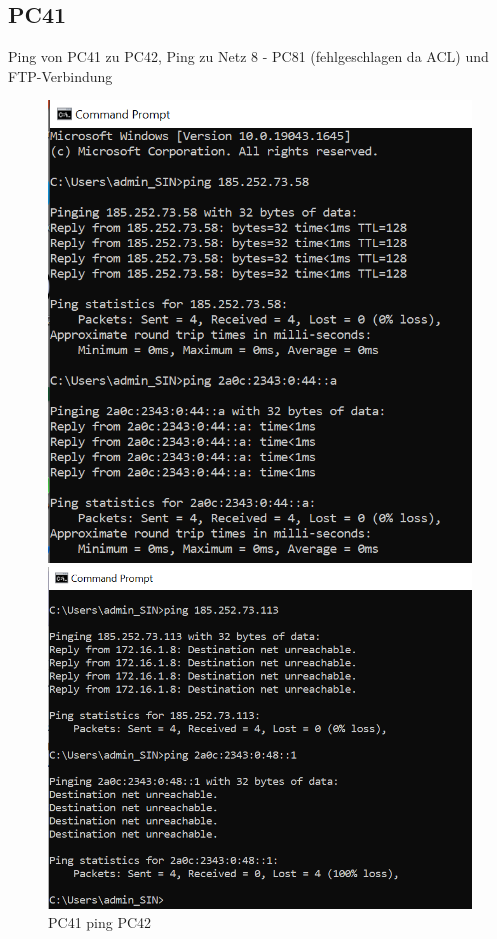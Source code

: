 \documentclass{article}
\begin{document}
\subsection{PC41}
Ping von PC41 zu PC42, Ping zu Netz 8 - PC81 (fehlgeschlagen da ACL) und FTP-Verbindung\\
\begin{figure}[!htp]
  \centering
  \begin{minipage}[b]{0.25\textwidth}
    \includegraphics[width=\textwidth]{Arbeitsergebnisse/PC41/pc41_ping_pc42.png}
    \caption{PC41 ping PC42}
  \end{minipage}
  \hspace{0.8cm}
  \begin{minipage}[b]{0.25\textwidth}
    \includegraphics[width=\textwidth]{Arbeitsergebnisse/PC41/pc41_ping_failed.png}

\end{minipage}
\end{figure}
\end{document}
